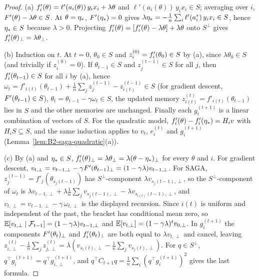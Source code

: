 \begin{proof}
(a) $f'_i(\theta)=\ell'(a_i(\theta))\,y_ix_i+\lambda\theta$ and $\ell'(a_i(\theta))\,y_ix_i\in S$; averaging over $i$,
$F'(\theta)-\lambda\theta\in S$. At $\theta=\eta_\ast$, $F'(\eta_\ast)=0$ gives
$\lambda\eta_\ast=-\frac1n\sum_i\ell'(a_i^\ast)\,y_ix_i\in S$, hence $\eta_\ast\in S$ because $\lambda>0$. Projecting
$f'_i(\theta)=[f'_i(\theta)-\lambda\theta]+\lambda\theta$ onto $S^\perp$ gives $f'_i(\theta)_\perp=\lambda\theta_\perp$.

(b) Induction on $t$. At $t=0$, $\theta_0\in S$ and $z_i^{(0)}=f'_i(\theta_0)\in S$ by (a), since $\lambda\theta_0\in S$
(and trivially if $z_i^{(0)}=0$). If $\theta_{t-1}\in S$ and $z_j^{(t-1)}\in S$ for all $j$, then $f'_i(\theta_{t-1})\in S$
for all $i$ by (a), hence $\omega_t=f'_{i(t)}(\theta_{t-1})+\frac1n\sum_jz_j^{(t-1)}-z_{i(t)}^{(t-1)}\in S$ (for gradient
descent, $F'(\theta_{t-1})\in S$), $\theta_t=\theta_{t-1}-\gamma\omega_t\in S$, the updated memory
$z_{i(t)}^{(t)}=f'_{i(t)}(\theta_{t-1})$ lies in $S$ and the other memories are unchanged. Finally each $g_i^{(t+1)}$ is a
linear combination of vectors of $S$. For the quadratic model, $f'_i(\theta)-f'_i(\eta_\ast)=H_iv$ with $H_iS\subseteq S$,
and the same induction applies to $v_t$, $e_i^{(t)}$ and $g_i^{(t+1)}$ (Lemma~\ref{lem:B2-saga-quadratic}(a)).

(c) By (a) and $\eta_\ast\in S$, $f'_i(\theta)_\perp=\lambda\theta_\perp=\lambda(\theta-\eta_\ast)_\perp$ for every $\theta$ and $i$.
For gradient descent, $v_{t,\perp}=v_{t-1,\perp}-\gamma F'(\theta_{t-1})_\perp=(1-\gamma\lambda)v_{t-1,\perp}$. For SAGA,
$z_j^{(t-1)}=f'_j(\theta_{s_j(t-1)})$ has $S^\perp$-component $\lambda v_{s_j(t-1),\perp}$, so the $S^\perp$-component of
$\omega_t$ is $\lambda v_{t-1,\perp}+\lambda\frac1n\sum_jv_{s_j(t-1),\perp}-\lambda v_{s_{i(t)}(t-1),\perp}$, and
$v_{t,\perp}=v_{t-1,\perp}-\gamma\,\omega_{t,\perp}$ is the displayed recursion. Since $i(t)$ is uniform and independent of
the past, the bracket has conditional mean zero, so $\mathbb{E}[v_{t,\perp}\mid\mathcal F_{t-1}]=(1-\gamma\lambda)v_{t-1,\perp}$ and
$\mathbb{E}[v_{t,\perp}]=(1-\gamma\lambda)^tv_{0,\perp}$. In $g_i^{(t+1)}$ the components $F'(\theta_t)_\perp$ and
$f'_i(\theta_t)_\perp$ are both equal to $\lambda v_{t,\perp}$ and cancel, leaving
$z_{i,\perp}^{(t)}-\frac1n\sum_jz_{j,\perp}^{(t)}=\lambda(v_{s_i(t),\perp}-\frac1n\sum_jv_{s_j(t),\perp})$. For $q\in S^\perp$,
$q^\top g_i^{(t+1)}=q^\top g_{i,\perp}^{(t+1)}$, and $q^\top C_{t+1}q=\frac1n\sum_i(q^\top g_i^{(t+1)})^2$ gives the last formula.
\end{proof}

